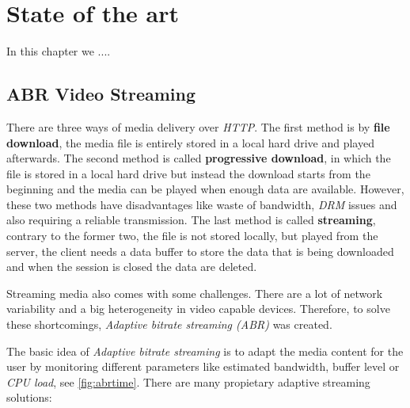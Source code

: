\chapter{State of the art}
\label{chap:soa}

In this chapter we ....


\section{ABR Video Streaming}
\label{sec:abr}

There are three ways of media delivery over \textit{HTTP}. The first method is by
\textbf{file download}, the media file is entirely stored in a local hard drive and played afterwards.
The second method is called \textbf{progressive download}, in which the file is stored in a local 
hard drive but instead the download starts from the beginning and the media can be played when
enough data are available. However, these two methods have disadvantages like waste of bandwidth,
\textit{DRM} issues and also requiring a reliable transmission. The last method is called
\textbf{streaming}, contrary to the former two, the file is not stored locally, but played from
the server, the client needs a data buffer to store the data that is being downloaded and
when the session is closed the data are deleted.

Streaming media also comes with some challenges. There are a lot of network variability
and a big heterogeneity in video capable devices. Therefore, to solve these shortcomings,
\textit{Adaptive bitrate streaming (ABR)} was created.

The basic idea of \textit{Adaptive bitrate streaming} is to adapt the media content
for the user by monitoring different parameters like estimated bandwidth, buffer level or
\textit{CPU load}, see \autoref{fig:abrtime}. There are many propietary adaptive streaming solutions:

